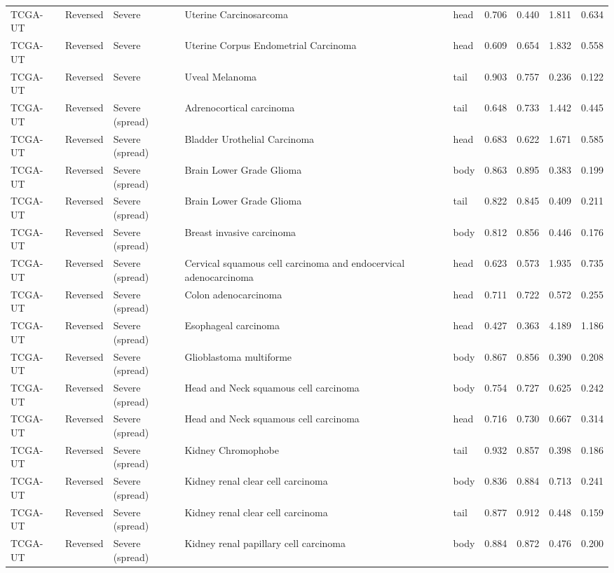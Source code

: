 \begin{longtable}{lllllrrrr}
TCGA-UT & Reversed & Severe & Uterine Carcinosarcoma & head & 0.706 & 0.440 & 1.811 & 0.634 \\
TCGA-UT & Reversed & Severe & Uterine Corpus Endometrial Carcinoma & head & 0.609 & 0.654 & 1.832 & 0.558 \\
TCGA-UT & Reversed & Severe & Uveal Melanoma & tail & 0.903 & 0.757 & 0.236 & 0.122 \\
TCGA-UT & Reversed & Severe (spread) & Adrenocortical carcinoma & tail & 0.648 & 0.733 & 1.442 & 0.445 \\
TCGA-UT & Reversed & Severe (spread) & Bladder Urothelial Carcinoma & head & 0.683 & 0.622 & 1.671 & 0.585 \\
TCGA-UT & Reversed & Severe (spread) & Brain Lower Grade Glioma & body & 0.863 & 0.895 & 0.383 & 0.199 \\
TCGA-UT & Reversed & Severe (spread) & Brain Lower Grade Glioma & tail & 0.822 & 0.845 & 0.409 & 0.211 \\
TCGA-UT & Reversed & Severe (spread) & Breast invasive carcinoma & body & 0.812 & 0.856 & 0.446 & 0.176 \\
TCGA-UT & Reversed & Severe (spread) & Cervical squamous cell carcinoma and endocervical adenocarcinoma & head & 0.623 & 0.573 & 1.935 & 0.735 \\
TCGA-UT & Reversed & Severe (spread) & Colon adenocarcinoma & head & 0.711 & 0.722 & 0.572 & 0.255 \\
TCGA-UT & Reversed & Severe (spread) & Esophageal carcinoma & head & 0.427 & 0.363 & 4.189 & 1.186 \\
TCGA-UT & Reversed & Severe (spread) & Glioblastoma multiforme & body & 0.867 & 0.856 & 0.390 & 0.208 \\
TCGA-UT & Reversed & Severe (spread) & Head and Neck squamous cell carcinoma & body & 0.754 & 0.727 & 0.625 & 0.242 \\
TCGA-UT & Reversed & Severe (spread) & Head and Neck squamous cell carcinoma & head & 0.716 & 0.730 & 0.667 & 0.314 \\
TCGA-UT & Reversed & Severe (spread) & Kidney Chromophobe & tail & 0.932 & 0.857 & 0.398 & 0.186 \\
TCGA-UT & Reversed & Severe (spread) & Kidney renal clear cell carcinoma & body & 0.836 & 0.884 & 0.713 & 0.241 \\
TCGA-UT & Reversed & Severe (spread) & Kidney renal clear cell carcinoma & tail & 0.877 & 0.912 & 0.448 & 0.159 \\
TCGA-UT & Reversed & Severe (spread) & Kidney renal papillary cell carcinoma & body & 0.884 & 0.872 & 0.476 & 0.200 \\

\end{longtable}
